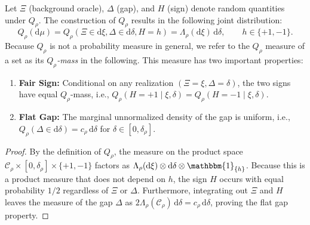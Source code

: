 \documentclass[10pt]{article}
\newcommand{\dd}{\mathrm{d}}
\theoremstyle{plain}
\begin{document}
\begin{lemma}
\label{lem:q_rho_properties}
Let $\Xi$ (background oracle), $\Delta$ (gap), and $H$ (sign) denote  random quantities under   $Q_\rho$. The construction of $Q_\rho$ results in the following joint distribution:
\begin{equation}
Q_\rho(\dd\mu) =Q_\rho(\Xi\in \dd\xi,\Delta\in \dd\delta,H=h) = \Lambda_\rho(\dd\xi)\,\dd\delta
, \qquad h\in\{+1,-1\}.\label{eqn:Q_rho_dist}    
\end{equation}
Because $Q_\rho$ is not a probability measure in general, we refer to the $Q_\rho$ measure of a set as its {\em $Q_\rho$-mass} in the following. This measure has two important properties:
\begin{enumerate}
    \item \textbf{Fair Sign:} Conditional on any realization $(\Xi=\xi, \Delta=\delta)$, the two signs have equal $Q_\rho$-mass, i.e., $Q_\rho(H=+1 \mid \xi, \delta) = Q_\rho(H=-1 \mid \xi, \delta)$.
    \item \textbf{Flat Gap:} The marginal unnormalized density of the gap is uniform, i.e., $Q_\rho(\Delta \in \dd\delta) = c_\rho\,\dd\delta$ for $\delta \in [0, \delta_\rho]$.
\end{enumerate}
\end{lemma}



\begin{proof}
By the definition of $Q_\rho$, the measure on the product space $\mathcal{C}_\rho \times [0, \delta_\rho] \times \{+1, -1\}$ factors as $\Lambda_\rho(\dd\xi) \otimes \dd\delta \otimes \mathbbm{1}_{\{h\}}$. Because this is a   product measure that does not depend on $h$, the sign $H$ occurs with equal probability $1/2$ regardless of $\Xi$ or $\Delta$. Furthermore, integrating out $\Xi$ and $H$ leaves the measure of the gap $\Delta$ as $2\Lambda_\rho(\mathcal{C}_\rho)\, \dd\delta = c_\rho \,\dd\delta$, proving the flat gap property. 
 
\end{proof}
\end{document}
